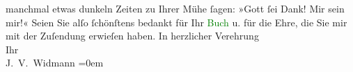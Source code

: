                     manchmal {\pb}etwas dunkeln Zeiten zu Ihrer Mühe
                    ſagen: »Gott ſei Dank! Mir sein mir!«\pend
           \pstart
           Seien Sie alſo ſchönſtens bedankt für Ihr \textcolor{green}{Buch}{} u. für die Ehre, die Sie mir mit der Zuſendung
                    erwieſen haben.\pend
           \pstart
           In herzlicher Verehrung{\\[\baselineskip]}Ihr{\\[\baselineskip]}\spacefill\mbox{J. V. Widmann}\pend
           \leftskip=0em{}\endnumbering{}  
      